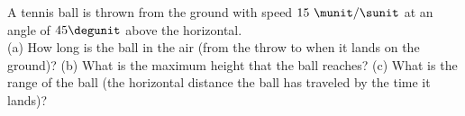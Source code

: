 A tennis ball is thrown from the ground with speed 
$15\ \munit/\sunit$ at an angle of $45\degunit$ above the horizontal.\\
%
(a) How long is the ball in the air (from the throw to when it lands
on the ground)?\answercheck\hwendpart
%
(b) What is the maximum height that the ball reaches?\answercheck\hwendpart
%
(c) What is the range of the ball (the horizontal distance the ball
has traveled by the time it lands)?\answercheck
